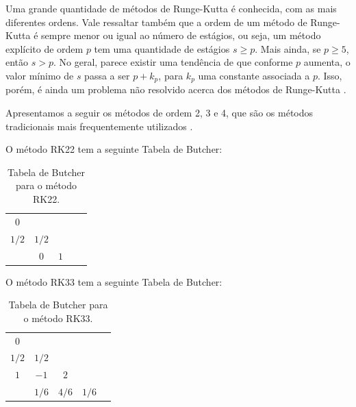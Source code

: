 Uma grande quantidade de métodos de Runge-Kutta é conhecida, com as mais diferentes ordens. Vale ressaltar também que a ordem de um método de Runge-Kutta é sempre menor ou igual ao número de estágios, ou seja, um método explícito de ordem $p$ tem uma quantidade de estágios $s \geq p$. Mais ainda, se $p \geq 5$, então $s > p$. No geral, parece existir uma tendência de que conforme $p$ aumenta, o valor mínimo de $s$ passa a ser $p + k_p$, para $k_p$ uma constante associada a $p$. Isso, porém, é ainda um problema não resolvido acerca dos métodos de Runge-Kutta \citep[187-196]{Butcher2016-jx}.

Apresentamos a seguir os métodos de ordem 2, 3 e 4, que são os métodos tradicionais mais frequentemente utilizados \citep[46-47]{alexandre_megiorin_roma_metodos_nodate}.

\begin{method}\label{metodo:rk22} 
    O método RK22 tem a seguinte Tabela de Butcher:
    \begin{table}[H]
        \centering
        \begin{tabular}{c|cccc}
             $0$      &       &      \\
             $1/2$    & $1/2$  &      \\
             \hline
                      & $0$ & $1$
        \end{tabular}
        \caption{Tabela de Butcher para o método RK22.}
    \end{table}
\end{method}

\begin{method}\label{metodo:rk33} 
    O método RK33 tem a seguinte Tabela de Butcher:
    \begin{table}[H]
        \centering
        \begin{tabular}{c|cccc}
             $0$      &       &       &     \\
             $1/2$    & $1/2$ &       &     \\
             $1$      & $-1$   & $2$  &     \\
             \hline
                      & $1/6$ & $4/6$ & $1/6$
        \end{tabular}
        \caption{Tabela de Butcher para o método RK33.}
    \end{table}
\end{method}

